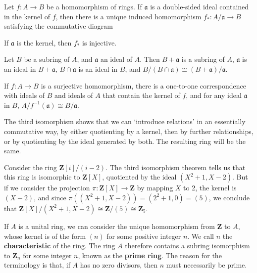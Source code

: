 \begin{theorem}
    Let $f:A \to B$ be a homomorphism of rings. If $\mathfrak{a}$ is a double-sided ideal contained in the kernel of $f$, then there is a unique induced homomorphism $f_*: A/\mathfrak{a} \to B$ satisfying the commutative diagram
    \begin{center}
    \end{center}
    If $\mathfrak{a}$ is the kernel, then $f_*$ is injective.
\end{theorem}

\begin{theorem}
    Let $B$ be a subring of $A$, and $\mathfrak{a}$ an ideal of $A$. Then $B + \mathfrak{a}$ is a subring of $A$, $\mathfrak{a}$ is an ideal in $B + \mathfrak{a}$, $B \cap \mathfrak{a}$ is an ideal in $B$, and $B/(B \cap \mathfrak{a}) \cong (B + \mathfrak{a})/\mathfrak{a}$.
\end{theorem}

\begin{theorem}
    If $f:A \to B$ is a surjective homomorphism, there is a one-to-one correspondence with ideals of $B$ and ideals of $A$ that contain the kernel of $f$, and for any ideal $\mathfrak{a}$ in $B$, $A/f^{-1}(\mathfrak{a}) \cong B/\mathfrak{a}$.
\end{theorem}

The third isomorphism shows that we can `introduce relations' in an essentially commutative way, by either quotienting by a kernel, then by further relationships, or by quotienting by the ideal generated by both. The resulting ring will be the same.

\begin{example}
    Consider the ring $\mathbf{Z}[i]/(i-2)$. The third isomorphism theorem tells us that this ring is isomorphic to $\mathbf{Z}[X]$, quotiented by the ideal $(X^2 + 1, X-2)$. But if we consider the projection $\pi: \mathbf{Z}[X] \to \mathbf{Z}$ by mapping $X$ to 2, the kernel is $(X - 2)$, and since $\pi((X^2 + 1, X - 2)) = (2^2 + 1, 0) = (5)$, we conclude that $\mathbf{Z}[X]/(X^2 + 1, X - 2) \cong \mathbf{Z}/(5) \cong \mathbf{Z}_5$.
\end{example}

If $A$ is a unital ring, we can consider the unique homomorphism from $\mathbf{Z}$ to $A$, whose kernel is of the form $(n)$ for some positive integer $n$. We call $n$ the {\bf characteristic} of the ring. The ring $A$ therefore contains a subring isomorphism to $\mathbf{Z}_n$ for some integer $n$, known as the {\bf prime ring}. The reason for the terminology is that, if $A$ has no zero divisors, then $n$ must necessarily be prime.

